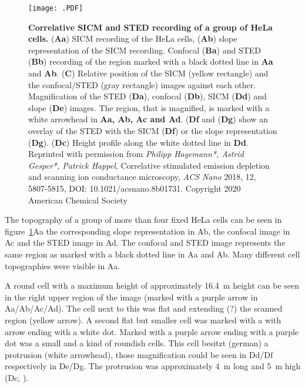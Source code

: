 \begin{figure}	
  \centering
    \texttt{[image: .PDF]} %
      \caption{
      \textbf{Correlative SICM and STED recording of a group of HeLa cells.} 
      (\textbf{Aa}) SICM recording of the HeLa cells, (\textbf{Ab}) slope representation of the
      SICM recording. Confocal (\textbf{Ba}) and STED (\textbf{Bb}) recording of the region marked 
      with a black dotted line in \textbf{Aa} and \textbf{Ab}. (\textbf{C}) Relative position of 
      the SICM (yellow rectangle) and the confocal/STED (gray rectangle) images against each 
      other. Magnification of the STED (\textbf{Da}), confocal (\textbf{Db}), SICM (\textbf{Dd}) 
      and slope (\textbf{De}) images. The region, that is magnified, is marked with a white 
      arrowhead in \textbf{Aa, Ab, Ac and Ad}. (\textbf{Df} and (\textbf{Dg}) show an overlay of 
      the STED with the SICM (\textbf{Df}) or the slope representation (\textbf{Dg}). 
      (\textbf{Dc}) Height profile along the white dotted line in \textbf{Dd}. \newline Reprinted 
      with permission from \emph{Philipp Hagemann*, Astrid Gesper*, Patrick Happel}, Correlative 
      stimulated emission depletion and scanning ion conductance microscopy, \emph{ACS Nano} 2018, 
      12, 5807-5815, DOI: 10.1021/acsnano.8b01731. Copyright 2020 American Chemical Society}
  \label{fig:SICM_STED1}
\end{figure}

The topography of a group of more than four fixed HeLa cells can be seen in 
figure~\ref{fig:SICM_STED1}Aa the corresponding slope representation in Ab, the confocal image in 
Ac and the STED image in Ad. The confocal and STED image represents the same region as marked with 
a black dotted line in Aa and Ab. Many different cell topographies were visible in Aa. 

A round cell with a maximum height of approximately 16.4~{\textmu}m height can be seen in the 
right upper region of the image (marked with a purple arrow in Aa/Ab/Ac/Ad). The cell next to this 
was flat and extending (?) the scanned region (yellow arrow). A second flat but smaller cell was 
marked with a with arrow ending with a white dot. Marked with a purple arrow ending with a purple
dot was a small and a kind of roundish cells. This cell besitzt (german)
a protrusion (white arrowhead), those magnification could be seen in Dd/Df respectively in De/Dg. 
The protrusion was approximately 4~{\textmu}m long and 5~{\textmu}m high (Dc, 
\cite{Hagemann2018}).

